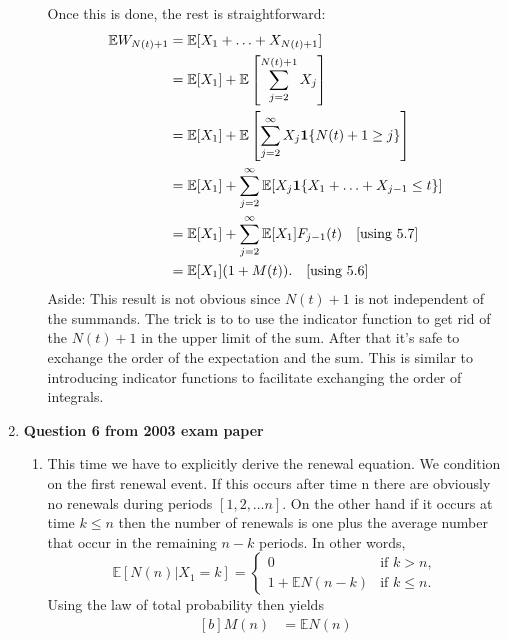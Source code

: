 \documentclass[11pt,a4paper]{article}
\begin{document}
\begin{enumerate}
\begin{enumerate}
      Once this is done, the rest is straightforward:
      \begin{align*}
        \mathbb{E}W_{N(t) + 1}
        &= \mathbb{E}[X_1 + \ldots + X_{N(t) + 1}]\\
        &= \mathbb{E}[X_1] + \mathbb{E}\left[\sum_{j = 2}^{N(t) + 1}X_j\right]\\
        &= \mathbb{E}[X_1] + \mathbb{E}\left[\sum_{j = 2}^\infty X_j\vb{1}\{N(t) + 1 \geq j\}\right]\\
        &= \mathbb{E}[X_1] + \sum_{j = 2}^\infty\mathbb{E}[X_j\vb{1}\{X_1 + \ldots + X_{j - 1} \leq t\}]\\
        &= \mathbb{E}[X_1] + \sum_{j = 2}^\infty\mathbb{E}[X_1]F_{j - 1}(t)\quad \text{[using 5.7]}\\
        &= \mathbb{E}[X_1](1 + M(t)).\quad \text{[using 5.6]}
      \end{align*}
      Aside: This result is not obvious since $N(t) + 1$ is not independent of the summands. The trick is to to use the indicator function to get rid of the $N(t) + 1$ in the upper limit of the sum. After that it's safe to exchange the order of the expectation and the sum. This is similar to introducing indicator functions to facilitate exchanging the order of integrals.
    \end{enumerate}
    \item \textbf{Question 6 from 2003 exam paper}
    \begin{enumerate}
      \item This time we have to explicitly derive the renewal equation. We condition on the first renewal event. If this occurs after time n there are obviously no renewals during periods $[1, 2,\ldots n]$. On the other hand if it occurs at time $k \leq n$ then the number of renewals is one plus the average number that occur in the remaining $n - k$ periods. In other words,
      \begin{equation}\tag{5.8}
        \mathbb{E}[N(n) | X_1 = k] =
        \begin{cases}
          0 & \text{if $k > n$},\\
          1 + \mathbb{E}N(n - k) & \text{if $k \leq n$}.
        \end{cases}
      \end{equation}
      Using the law of total probability then yields
      \begin{equation}\tag{5.9}
        \begin{aligned}[b]
          M(n)
          &= \mathbb{E}N(n)\\

\end{aligned}
\end{equation}
\end{enumerate}
\end{enumerate}
\end{document}
